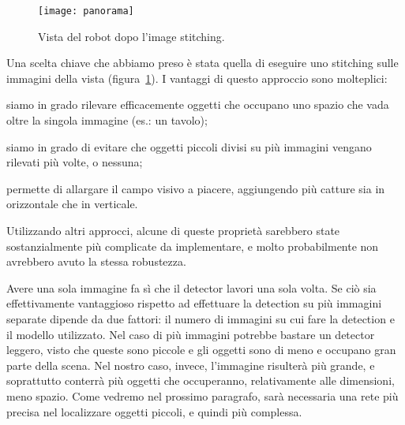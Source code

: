 \begin{figure}
	\centering
	\texttt{[image: panorama]}
	\caption{Vista del robot dopo l'image stitching.}\label{fig:panorama}
\end{figure}

Una scelta chiave che abbiamo preso è stata quella di eseguire uno stitching sulle immagini della vista (figura~\ref{fig:panorama}). I vantaggi di questo approccio sono molteplici: \begin{enumerate*}[label={(\arabic*)}] \item siamo in grado rilevare efficacemente oggetti che occupano uno spazio che vada oltre la singola immagine (es.\@: un tavolo); \item siamo in grado di evitare che oggetti piccoli divisi su più immagini vengano rilevati più volte, o nessuna; \item permette di allargare il campo visivo a piacere, aggiungendo più catture sia in orizzontale che in verticale.\end{enumerate*} Utilizzando altri approcci, alcune di queste proprietà sarebbero state sostanzialmente più complicate da implementare, e molto probabilmente non avrebbero avuto la stessa robustezza.

\label{sec:master_small_img}Avere una sola immagine fa sì che il detector lavori una sola volta. Se ciò sia effettivamente vantaggioso rispetto ad effettuare la detection su più immagini separate dipende da due fattori: il numero di immagini su cui fare la detection e il modello utilizzato. Nel caso di più immagini potrebbe bastare un detector leggero, visto che queste sono piccole e gli oggetti sono di meno e occupano gran parte della scena. Nel nostro caso, invece, l'immagine risulterà più grande, e soprattutto conterrà più oggetti che occuperanno, relativamente alle dimensioni, meno spazio. Come vedremo nel prossimo paragrafo, sarà necessaria una rete più precisa nel localizzare oggetti piccoli, e quindi più complessa.